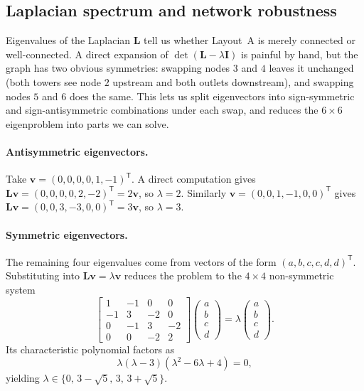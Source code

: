 \documentclass[11pt,a4paper]{article}
\newcommand{\mat}[1]{\mathbf{#1}}
\newcommand{\vect}[1]{\mathbf{#1}}
\newcommand{\transpose}{^{\mathsf{T}}}
\begin{document}
\subsection{Laplacian spectrum and network robustness}
\label{sec:refinery-spectrum}

Eigenvalues of the Laplacian $\mat{L}$ tell us whether Layout~A is
merely connected or well-connected. A direct expansion of
$\det(\mat{L} - \lambda \mat{I})$ is painful by hand, but the graph
has two obvious symmetries: swapping nodes $3$ and $4$ leaves it
unchanged (both towers see node $2$ upstream and both outlets
downstream), and swapping nodes $5$ and $6$ does the same. This lets
us split eigenvectors into sign-symmetric and sign-antisymmetric
combinations under each swap, and reduces the $6 \times 6$
eigenproblem into parts we can solve.

\paragraph{Antisymmetric eigenvectors.}
Take $\vect{v} = (0, 0, 0, 0, 1, -1)\transpose$. A direct computation
gives $\mat{L}\vect{v} = (0, 0, 0, 0, 2, -2)\transpose = 2\vect{v}$, so
$\lambda = 2$. Similarly $\vect{v} = (0, 0, 1, -1, 0, 0)\transpose$
gives $\mat{L}\vect{v} = (0, 0, 3, -3, 0, 0)\transpose = 3\vect{v}$, so
$\lambda = 3$.

\paragraph{Symmetric eigenvectors.}
The remaining four eigenvalues come from vectors of the form
$(a, b, c, c, d, d)\transpose$. Substituting into $\mat{L}\vect{v} =
\lambda \vect{v}$ reduces the problem to the $4 \times 4$ non-symmetric
system
\[
\begin{bmatrix}
 1 & -1 & 0 & 0 \\
 -1 & 3 & -2 & 0 \\
 0 & -1 & 3 & -2 \\
 0 & 0 & -2 & 2
\end{bmatrix}
\begin{pmatrix} a \\ b \\ c \\ d \end{pmatrix}
=
\lambda
\begin{pmatrix} a \\ b \\ c \\ d \end{pmatrix}.
\]
Its characteristic polynomial factors as
\[
  \lambda(\lambda - 3)(\lambda^2 - 6\lambda + 4) = 0,
\]
yielding $\lambda \in \{0,\, 3 - \sqrt{5},\, 3,\, 3 + \sqrt{5}\}$.
\end{document}
